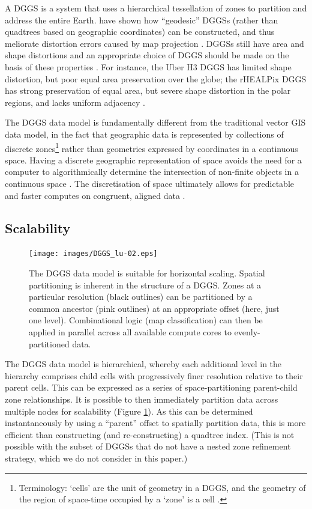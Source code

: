 \documentclass[]{interact}
\theoremstyle{plain}%
\theoremstyle{definition}
\theoremstyle{remark}
\begin{document}
A \ac{DGGS} is a system that uses a hierarchical tessellation of zones to partition and address the entire Earth. \citet{sahr2003geodesic} have shown how ``geodesic'' \acp{DGGS} (rather than quadtrees based on geographic coordinates) can be constructed, and thus meliorate distortion errors caused by map projection \citep{goodchild2018reimagining}. \Acp{DGGS} still have area and shape distortions and an appropriate choice of \ac{DGGS} should be made on the basis of these properties \citep{kmoch2022area}. For instance, the Uber H3 \ac{DGGS} has limited shape distortion, but poor equal area preservation over the globe; the rHEALPix \ac{DGGS} has strong preservation of equal area, but severe shape distortion in the polar regions, and lacks uniform adjacency \citep{kmoch2022area,gibb2016rhealpix,bowater2019exploring}.

The \ac{DGGS} data model is fundamentally different from the traditional vector \ac{GIS} data model, in the fact that geographic data is represented by collections of discrete zones\footnote{Terminology: `cells' are the unit of geometry in a \ac{DGGS}, and the geometry of the region of space-time occupied by a `zone' is a cell \citep{topic21}.} rather than geometries expressed by coordinates in a continuous space. Having a discrete geographic representation of space avoids the need for a computer to algorithmically determine the intersection of non-finite objects in a continuous space \citep{bentley1979algorithms,robertson2020integrated}. The discretisation of space ultimately allows for predictable and faster computes on congruent, aligned data \citep{dutton1989modelling}.

\subsection{Scalability}

\begin{figure}[t]
    \centering
    \texttt{[image: images/DGGS\_lu-02.eps]}
    \caption{The \ac{DGGS} data model is suitable for horizontal scaling. Spatial partitioning is inherent in the structure of a \ac{DGGS}. Zones at a particular resolution (black outlines) can be partitioned by a common ancestor (pink outlines) at an appropriate offset (here, just one level). Combinational logic (map classification) can then be applied in parallel across all available compute cores to evenly-partitioned data.}
    \label{fig:Scalable}
\end{figure}

The \ac{DGGS} data model is hierarchical, whereby each additional level in the hierarchy comprises child cells with progressively finer resolution relative to their parent cells. This can be expressed as a series of space-partitioning parent-child zone relationships. It is possible to then immediately partition data across multiple nodes for scalability (Figure \ref{fig:Scalable}). As this can be determined instantaneously by using a ``parent'' offset to spatially partition data, this is more efficient than constructing (and re-constructing) a quadtree index. (This is not possible with the subset of \acp{DGGS} that do not have a nested zone refinement strategy, which we do not consider in this paper.)
\end{document}

